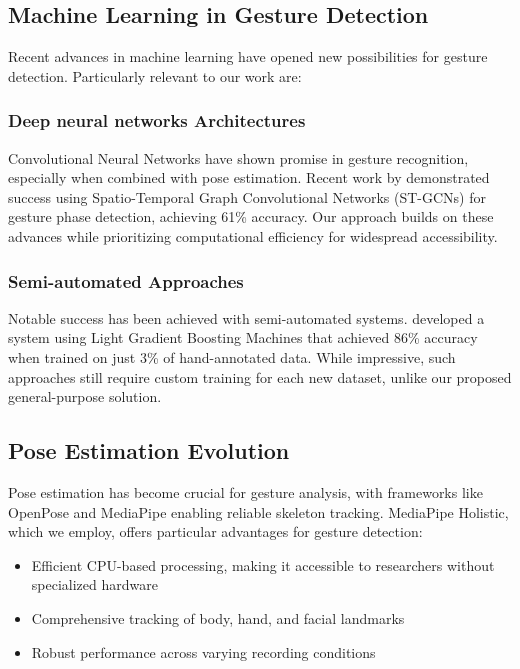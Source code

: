 \subsection{Machine Learning in Gesture Detection}\label{subsec:ml}
Recent advances in machine learning have opened new possibilities for gesture detection. Particularly relevant to our work are:

\subsubsection{Deep neural networks Architectures}
Convolutional Neural Networks have shown promise in gesture recognition, especially when combined with pose estimation. Recent work by \citet{ghalebCoSpeechGestureDetection2024} demonstrated success using Spatio-Temporal Graph Convolutional Networks (ST-GCNs) for gesture phase detection, achieving 61\% accuracy. Our approach builds on these advances while prioritizing computational efficiency for widespread accessibility.

\subsubsection{Semi-automated Approaches}
Notable success has been achieved with semi-automated systems. \citet{ienagaSemiautomationGestureAnnotation2022} developed a system using Light Gradient Boosting Machines that achieved 86\% accuracy when trained on just 3\% of hand-annotated data. While impressive, such approaches still require custom training for each new dataset, unlike our proposed general-purpose solution.

\subsection{Pose Estimation Evolution}\label{subsec:pose}
Pose estimation has become crucial for gesture analysis, with frameworks like OpenPose \citep{caoOpenPoseRealtimeMultiPerson2021} and MediaPipe \citep{lugaresiMediaPipeFrameworkBuilding2019} enabling reliable skeleton tracking. MediaPipe Holistic, which we employ, offers particular advantages for gesture detection:
\begin{itemize}
    \item Efficient CPU-based processing, making it accessible to researchers without specialized hardware
    \item Comprehensive tracking of body, hand, and facial landmarks
    \item Robust performance across varying recording conditions
\end{itemize}

